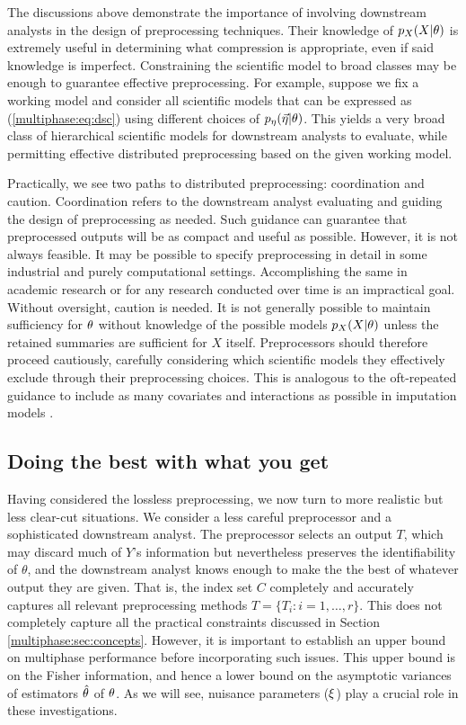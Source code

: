 The discussions above demonstrate   the importance of involving downstream analysts in the design of preprocessing techniques.
Their knowledge of $p_X(X | \theta)$ is extremely useful in determining what compression is appropriate, even if said knowledge is imperfect.
Constraining the scientific model to broad classes may be enough to guarantee effective preprocessing.
For example, suppose we fix a working model and consider all scientific models that can be expressed as (\ref{multiphase:eq:dsc}) using different choices of $p_\eta(\vec {\eta} | \theta)$.
This yields a very broad class of hierarchical scientific models for downstream analysts to evaluate, while permitting effective distributed preprocessing based on the given working model.

Practically, we see two paths to distributed preprocessing: coordination and caution.
Coordination refers to the downstream analyst evaluating and guiding the design of preprocessing as needed.
Such guidance can guarantee that preprocessed outputs will be as compact and useful as possible.
However, it is not always feasible.
It may be possible to specify preprocessing in detail in some industrial and purely computational settings.
Accomplishing the same in academic research or for any research conducted over time is an impractical goal.
Without oversight, caution is needed.
It is not generally possible to maintain sufficiency for $\theta$ without knowledge of the possible models $p_X(X | \theta)$ unless the retained summaries are sufficient for $X$ itself.
Preprocessors should therefore proceed cautiously, carefully considering which scientific models they effectively exclude through their preprocessing choices.
This is analogous to the oft-repeated guidance to include as many covariates and interactions as possible in imputation models \citep{Meng1994,Meng2003}.



\subsection{Doing the best with what you get}
\label{multiphase:sec:missinfo}

Having considered the lossless preprocessing, we now turn to more realistic but less clear-cut situations.
We consider a less careful preprocessor and a sophisticated downstream analyst.
The preprocessor selects an output $T$, which may discard much of $Y$'s information but nevertheless preserves the identifiability of $\theta$, and the downstream analyst knows enough to make the the best of whatever output they are given.
That is, the  index set $C$ completely and accurately captures all relevant preprocessing methods $T=\{ T_i: i=1,\ldots, r \}$.
This does not completely capture all the practical constraints discussed in Section \ref{multiphase:sec:concepts}.
However, it is important to establish an upper bound on multiphase performance before incorporating such issues.
This upper bound is on the Fisher information, and hence a lower bound on the asymptotic variances of estimators $\hat{\theta}$ of $\theta$.
As we will see, nuisance parameters ($\xi$) play a crucial role in these investigations.

